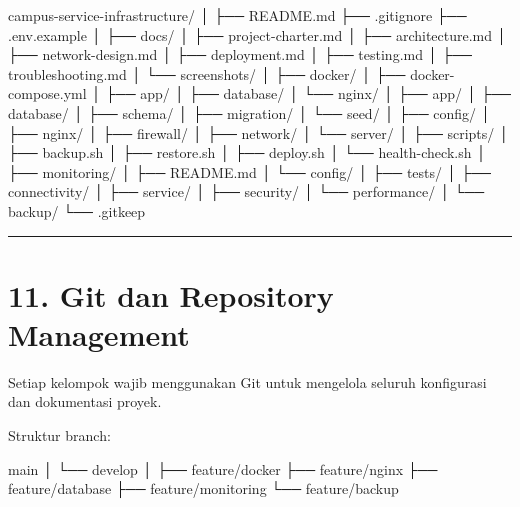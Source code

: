 \documentclass[
]{article}
\newenvironment{Shaded}{\begin{snugshade}}{\end{snugshade}}
\newcommand{\NormalTok}[1]{#1}
\begin{document}
\begin{Shaded}
\begin{Highlighting}[]
\NormalTok{campus{-}service{-}infrastructure/}
\NormalTok{│}
\NormalTok{├── README.md}
\NormalTok{├── .gitignore}
\NormalTok{├── .env.example}
\NormalTok{│}
\NormalTok{├── docs/}
\NormalTok{│   ├── project{-}charter.md}
\NormalTok{│   ├── architecture.md}
\NormalTok{│   ├── network{-}design.md}
\NormalTok{│   ├── deployment.md}
\NormalTok{│   ├── testing.md}
\NormalTok{│   ├── troubleshooting.md}
\NormalTok{│   └── screenshots/}
\NormalTok{│}
\NormalTok{├── docker/}
\NormalTok{│   ├── docker{-}compose.yml}
\NormalTok{│   ├── app/}
\NormalTok{│   ├── database/}
\NormalTok{│   └── nginx/}
\NormalTok{│}
\NormalTok{├── app/}
\NormalTok{│}
\NormalTok{├── database/}
\NormalTok{│   ├── schema/}
\NormalTok{│   ├── migration/}
\NormalTok{│   └── seed/}
\NormalTok{│}
\NormalTok{├── config/}
\NormalTok{│   ├── nginx/}
\NormalTok{│   ├── firewall/}
\NormalTok{│   ├── network/}
\NormalTok{│   └── server/}
\NormalTok{│}
\NormalTok{├── scripts/}
\NormalTok{│   ├── backup.sh}
\NormalTok{│   ├── restore.sh}
\NormalTok{│   ├── deploy.sh}
\NormalTok{│   └── health{-}check.sh}
\NormalTok{│}
\NormalTok{├── monitoring/}
\NormalTok{│   ├── README.md}
\NormalTok{│   └── config/}
\NormalTok{│}
\NormalTok{├── tests/}
\NormalTok{│   ├── connectivity/}
\NormalTok{│   ├── service/}
\NormalTok{│   ├── security/}
\NormalTok{│   └── performance/}
\NormalTok{│}
\NormalTok{└── backup/}
\NormalTok{    └── .gitkeep}
\end{Highlighting}
\end{Shaded}

\begin{center}\rule{0.5\linewidth}{0.5pt}\end{center}

\section{11. Git dan Repository
Management}\label{git-dan-repository-management}

Setiap kelompok wajib menggunakan Git untuk mengelola seluruh
konfigurasi dan dokumentasi proyek.

Struktur branch:

\begin{Shaded}
\begin{Highlighting}[]
\NormalTok{main}
\NormalTok{ │}
\NormalTok{ └── develop}
\NormalTok{      │}
\NormalTok{      ├── feature/docker}
\NormalTok{      ├── feature/nginx}
\NormalTok{      ├── feature/database}
\NormalTok{      ├── feature/monitoring}
\NormalTok{      └── feature/backup}
\end{Highlighting}
\end{Shaded}
\end{document}
